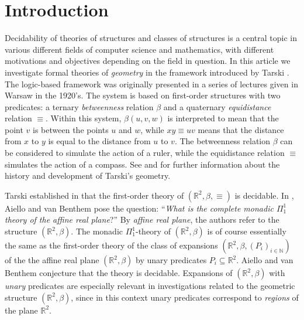 \documentclass{LMCS}
\theoremstyle{plain}
\begin{document}
\maketitle

\section{Introduction}
%
Decidability of theories of  structures and 
%
classes of structures is a
central topic in various different fields of computer science and
mathematics, with different motivations and objectives
depending on the field in question.
In this article we investigate formal theories of \emph{geometry} in the
framework introduced by Tarski \cite{Tarski:1948, TarskiGivant:1999}.
The logic-based framework was originally presented in a series of lectures 
given in Warsaw in the 1920's.
The system is based on first-order structures with two
predicates: a ternary \emph{betweenness} relation $\beta$ and a quaternary
\emph{equidistance} relation $\equiv$.
Within this system, $\beta(u,v,w)$ is interpreted to mean that the point
$v$ is between the points $u$ and $w$,
while $x y\equiv u v$ means that the
distance from $x$ to $y$ is equal to the distance from $u$ to $v$.
The betweenness relation $\beta$
can be considered to simulate the action of a ruler,
while the equidistance relation $\equiv$ simulates the action of a compass.
See \cite{schw} and \cite{TarskiGivant:1999} for further information about the
history and development of Tarski's geometry.

Tarski established in \cite{Tarski:1948}
that the first-order theory of
$(\mathbb{R}^2,\beta,\equiv)$ is decidable.
In \cite{vanBenthemAiello:2002}, Aiello and van Benthem
pose the question: ``\emph{What is the complete monadic $\Pi^1_1$ theory of the affine real plane}?''
By \emph{affine real plane}, the authors refer to the structure $(\mathbb{R}^2,\beta)$.
The monadic $\Pi_1^1$-theory of $(\mathbb{R}^2,\beta)$ is of course
essentially the same as the first-order theory of the class of
expansions $(\mathbb{R}^2,\beta,(P_i)_{i\in\mathbb{N}})$
of the the affine real plane $(\mathbb{R}^2,\beta)$ by unary predicates $P_i\subseteq\mathbb{R}^2$.
Aiello and van Benthem conjecture that the theory is decidable. Expansions of $(\mathbb{R}^2,\beta)$
with \emph{unary} predicates are especially relevant in
investigations related to the geometric structure $(\mathbb{R}^2,\beta)$, since in this 
context unary predicates correspond to 
\emph{regions} of the plane $\mathbb{R}^2$.
\end{document}
